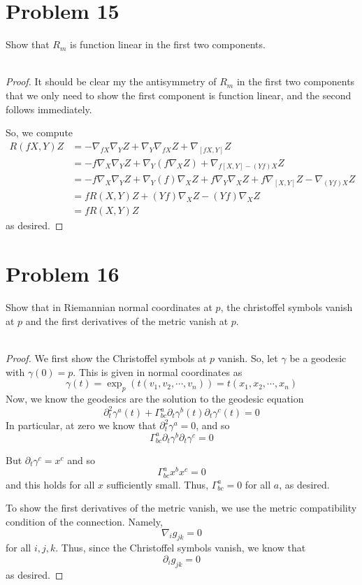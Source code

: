 \documentclass[fontsize=11pt]{scrartcl} %
\numberwithin{equation}{section} %
\numberwithin{figure}{section} %
\numberwithin{table}{section} %
\begin{document}
\section*{Problem 15}
Show that $R_m$ is function linear in the first two components.
\\
\\
\begin{proof}
    It should be clear my the antisymmetry of $R_m$ in the first two components
    that we only need to show the first component is function linear, and the
    second follows immediately.

    So, we compute
    \[
\begin{aligned}
    R(fX,Y)Z &= -\nabla_{fX}\nabla_YZ + \nabla_Y\nabla_{fX}Z + \nabla_{[fX,Y]}Z\\
    &= -f\nabla_X\nabla_YZ + \nabla_Y(f\nabla_XZ) +\nabla_{f[X,Y] -(Yf)X}Z\\
    &= -f\nabla_X\nabla_YZ +\nabla_Y(f)\nabla_XZ + f\nabla_Y\nabla_XZ
    +f\nabla_{[X,Y]}Z - \nabla_{(Yf)X}Z\\
    &= fR(X,Y)Z + (Yf)\nabla_XZ - (Yf)\nabla_XZ\\
    &= fR(X,Y)Z
\end{aligned}
    \]
    as desired.
\end{proof}

\section*{Problem 16}
Show that in Riemannian normal coordinates at $p$, the christoffel symbols
vanish at $p$ and the first derivatives of the metric vanish at $p$. 
\\
\\
\begin{proof}
    We first show the Christoffel symbols at $p$ vanish. So, let $\gamma$ be a
    geodesic with $\gamma(0)=p$. This is given in normal coordinates as
    \[
        \gamma(t) = \exp_p(t(v_1,v_2,\cdots,v_n)) = t(x_1,x_2,\cdots,x_n)
    \]
    Now, we know the geodesics are the solution to the geodesic equation
    \[
        \partial_t^2\gamma^a(t)
        +\Gamma_{bc}^a\partial_t\gamma^b(t)\partial_t\gamma^c(t) = 0
    \]
    In particular, at zero we know that $\partial_t^2\gamma^a=0$, and so
    \[
        \Gamma_{bc}^a\partial_t\gamma^b\partial_t\gamma^c = 0
    \]

    But $\partial_t\gamma^c = x^c$ and so
    \[
        \Gamma_{bc}^ax^bx^c=0
    \]
    and this holds for all $x$ sufficiently small. Thus, $\Gamma_{bc}^a=0$ for
    all $a$, as desired.

    To show the first derivatives of the metric vanish, we use the metric
    compatibility condition of the connection. Namely,
    \[
        \nabla_ig_{jk}=0
    \]
    for all $i,j,k$. Thus, since the Christoffel symbols vanish, we know that
    \[
    \partial_ig_{jk}=0
    \]
    as desired.
\end{proof}
\end{document}
